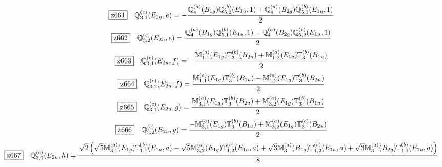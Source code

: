 \documentclass[fleqn,10pt,landscape]{jsarticle}
\begin{document}
\begin{dmath*}
\hspace*{3mm}\fbox{z661}\quad \mathbb{Q}_{3,1}^{(c)}(E_{2u},e)=- \frac{\mathbb{Q}_{4}^{(a)}(B_{1g}) \mathbb{Q}_{5,2}^{(b)}(E_{1u},1) + \mathbb{Q}_{4}^{(a)}(B_{2g}) \mathbb{Q}_{5,1}^{(b)}(E_{1u},1)}{2}
\end{dmath*}
\begin{dmath*}
\hspace*{3mm}\fbox{z662}\quad \mathbb{Q}_{3,2}^{(c)}(E_{2u},e)=\frac{\mathbb{Q}_{4}^{(a)}(B_{1g}) \mathbb{Q}_{5,1}^{(b)}(E_{1u},1) - \mathbb{Q}_{4}^{(a)}(B_{2g}) \mathbb{Q}_{5,2}^{(b)}(E_{1u},1)}{2}
\end{dmath*}
\begin{dmath*}
\hspace*{3mm}\fbox{z663}\quad \mathbb{Q}_{3,1}^{(c)}(E_{2u},f)=- \frac{\mathbb{M}_{1,1}^{(a)}(E_{1g}) \mathbb{T}_{3}^{(b)}(B_{2u}) + \mathbb{M}_{1,2}^{(a)}(E_{1g}) \mathbb{T}_{3}^{(b)}(B_{1u})}{2}
\end{dmath*}
\begin{dmath*}
\hspace*{3mm}\fbox{z664}\quad \mathbb{Q}_{3,2}^{(c)}(E_{2u},f)=\frac{\mathbb{M}_{1,1}^{(a)}(E_{1g}) \mathbb{T}_{3}^{(b)}(B_{1u}) - \mathbb{M}_{1,2}^{(a)}(E_{1g}) \mathbb{T}_{3}^{(b)}(B_{2u})}{2}
\end{dmath*}
\begin{dmath*}
\hspace*{3mm}\fbox{z665}\quad \mathbb{Q}_{3,1}^{(c)}(E_{2u},g)=\frac{\mathbb{M}_{3,1}^{(a)}(E_{1g}) \mathbb{T}_{3}^{(b)}(B_{2u}) + \mathbb{M}_{3,2}^{(a)}(E_{1g}) \mathbb{T}_{3}^{(b)}(B_{1u})}{2}
\end{dmath*}
\begin{dmath*}
\hspace*{3mm}\fbox{z666}\quad \mathbb{Q}_{3,2}^{(c)}(E_{2u},g)=\frac{- \mathbb{M}_{3,1}^{(a)}(E_{1g}) \mathbb{T}_{3}^{(b)}(B_{1u}) + \mathbb{M}_{3,2}^{(a)}(E_{1g}) \mathbb{T}_{3}^{(b)}(B_{2u})}{2}
\end{dmath*}
\begin{dmath*}
\hspace*{3mm}\fbox{z667}\quad \mathbb{Q}_{3,1}^{(c)}(E_{2u},h)=\frac{\sqrt{2} \left(\sqrt{5} \mathbb{M}_{3,1}^{(a)}(E_{1g}) \mathbb{T}_{1,1}^{(b)}(E_{1u},a) - \sqrt{5} \mathbb{M}_{3,2}^{(a)}(E_{1g}) \mathbb{T}_{1,2}^{(b)}(E_{1u},a) + \sqrt{3} \mathbb{M}_{3}^{(a)}(B_{1g}) \mathbb{T}_{1,2}^{(b)}(E_{1u},a) + \sqrt{3} \mathbb{M}_{3}^{(a)}(B_{2g}) \mathbb{T}_{1,1}^{(b)}(E_{1u},a)\right)}{8}
\end{dmath*}
\end{document}
